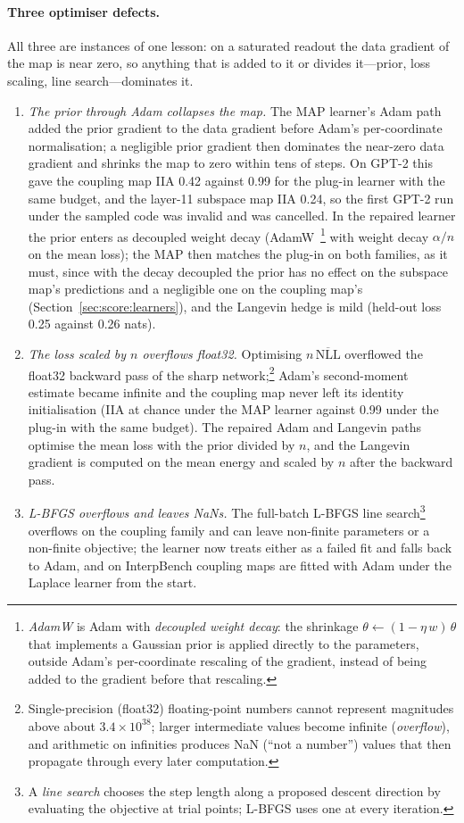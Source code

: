 \documentclass[11pt,a4paper]{article}
\begin{document}
\paragraph{Three optimiser defects.} All three are instances of one lesson: on a saturated readout the data gradient of the map is near zero, so anything that is added to it or divides it---prior, loss scaling, line search---dominates it.
\begin{enumerate}
\item \emph{The prior through Adam collapses the map.} The MAP learner's Adam path added the prior gradient to the data gradient before Adam's per-coordinate normalisation; a negligible prior gradient then dominates the near-zero data gradient and shrinks the map to zero within tens of steps. On GPT-2 this gave the coupling map IIA 0.42 against 0.99 for the plug-in learner with the same budget, and the layer-11 subspace map IIA 0.24, so the first GPT-2 run under the sampled code was invalid and was cancelled. In the repaired learner the prior enters as decoupled weight decay (AdamW~\cite{loshchilov2019adamw}\footnote{\emph{AdamW} is Adam with \emph{decoupled weight decay}: the shrinkage $\theta\leftarrow(1-\eta\,w)\,\theta$ that implements a Gaussian prior is applied directly to the parameters, outside Adam's per-coordinate rescaling of the gradient, instead of being added to the gradient before that rescaling.} with weight decay $\alpha/n$ on the mean loss); the MAP then matches the plug-in on both families, as it must, since with the decay decoupled the prior has no effect on the subspace map's predictions and a negligible one on the coupling map's (Section~\ref{sec:score:learners}), and the Langevin hedge is mild (held-out loss 0.25 against 0.26 nats).
\item \emph{The loss scaled by $n$ overflows float32.} Optimising $n\,\overline{\mathrm{NLL}}$ overflowed the float32 backward pass of the sharp network;\footnote{Single-precision (float32) floating-point numbers cannot represent magnitudes above about $3.4\times10^{38}$; larger intermediate values become infinite (\emph{overflow}), and arithmetic on infinities produces NaN (``not a number'') values that then propagate through every later computation.} Adam's second-moment estimate became infinite and the coupling map never left its identity initialisation (IIA at chance under the MAP learner against 0.99 under the plug-in with the same budget). The repaired Adam and Langevin paths optimise the mean loss with the prior divided by $n$, and the Langevin gradient is computed on the mean energy and scaled by $n$ after the backward pass.
\item \emph{L-BFGS overflows and leaves NaNs.} The full-batch L-BFGS line search\footnote{A \emph{line search} chooses the step length along a proposed descent direction by evaluating the objective at trial points; L-BFGS uses one at every iteration.} overflows on the coupling family and can leave non-finite parameters or a non-finite objective; the learner now treats either as a failed fit and falls back to Adam, and on InterpBench coupling maps are fitted with Adam under the Laplace learner from the start.
\end{enumerate}
\end{document}
